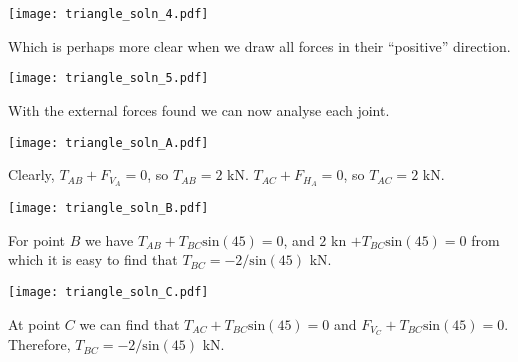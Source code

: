 {\begin{enumerate}
{{ \begin{center}
    \texttt{[image: triangle\_soln\_4.pdf]}
  \end{center}
Which is perhaps more clear when we draw all forces in their ``positive'' direction.
 \begin{center}
    \texttt{[image: triangle\_soln\_5.pdf]}
  \end{center}
With the external forces found we can now analyse each joint.
 \begin{center}
    \texttt{[image: triangle\_soln\_A.pdf]}
  \end{center}
Clearly, $T_{AB}+F_{V_{A}}=0$, so $T_{AB}=2$ kN.  $T_{AC}+F_{H_{A}}=0$, so $T_{AC}=2$ kN.
 \begin{center}
    \texttt{[image: triangle\_soln\_B.pdf]}
  \end{center}
For point $B$ we have $T_{AB}+T_{BC}\mathrm{sin}(45)=0$, and $2$ kn $+T_{BC}\mathrm{sin}(45)=0$ from which it is easy to find that $T_{BC}=-2/ \mathrm{sin}(45)$ kN.
 \begin{center}
    \texttt{[image: triangle\_soln\_C.pdf]}
  \end{center} 
At point $C$ we can find that $T_{AC}+T_{BC}\mathrm{sin}(45)=0$ and $F_{V_{C}}+T_{BC}\mathrm{sin}(45)=0$. Therefore, $T_{BC}=-2/ \mathrm{sin}(45)$ kN. }}
  \end{enumerate}
}

